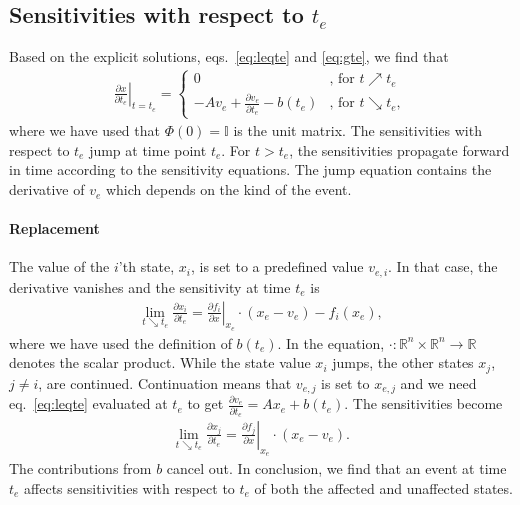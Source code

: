 \documentclass[journal, a4paper]{IEEEtran}
\begin{document}
\subsection{Sensitivities with respect to $t_e$}
Based on the explicit solutions, eqs.~\eqref{eq:leqte} and \eqref{eq:gte}, we find that
\begin{align}
    \left.\frac{\partial x}{\partial t_e}\right|_{t = t_e} =
    \left\{
    \begin{array}{ll}
    0     & \textrm{, for } t\nearrow t_e \\
    -A v_e + \frac{\partial v_e}{\partial t_e} - b(t_e)     & \textrm{, for }t \searrow t_e, 
    \end{array}
    \right.
    \label{eq:jump}
\end{align}
where we have used that $\Phi(0) = \mathbb I$ is the unit matrix. The sensitivities with respect to $t_e$ jump at time point $t_e$. For $t > t_e$, the sensitivities propagate forward in time according to the sensitivity equations. The jump equation contains the derivative of $v_e$ which depends on the kind of the event.\\

\paragraph{Replacement} 
The value of the $i$'th state, $x_i$, is set to a predefined value $v_{e, i}$. In that case, the derivative vanishes and the sensitivity at time $t_e$ is
\begin{align}
    \lim_{t\searrow t_e}\frac{\partial x_i}{\partial t_e} = \left.\frac{\partial f_i}{\partial x}\right|_{x_e}\cdot (x_e - v_e) - f_i(x_e),
    \label{eq:replace}
\end{align}
where we have used the definition of $b(t_e)$. In the equation, $\cdot: \mathbb R^n\times \mathbb R^n\rightarrow \mathbb R$ denotes the scalar product. While the state value $x_i$ jumps, the other states $x_j$, $j\neq i$, are continued. Continuation means that $v_{e, j}$ is set to $x_{e, j}$ and we need eq.~\eqref{eq:leqte} evaluated at $t_e$ to get $\frac{\partial v_e}{\partial t_e} = Ax_e + b(t_e)$. The sensitivities become 
\begin{align}
    \lim_{t\searrow t_e}\frac{\partial x_j}{\partial t_e} = \left.\frac{\partial f_j}{\partial x}\right|_{x_e}\cdot (x_e - v_e).\label{eq:continued}
\end{align}
The contributions from $b$ cancel out. In conclusion, we find that an event at time $t_e$ affects sensitivities with respect to $t_e$ of both the affected and unaffected states.\\
\end{document}
